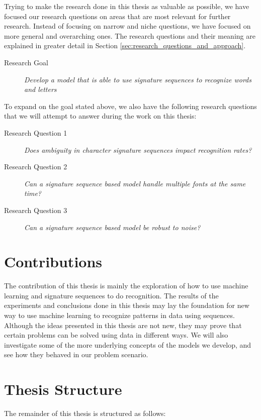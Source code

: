 Trying to make the research done in this thesis as valuable as possible, we have focused our research questions on areas that are most relevant for further research. Instead of focusing on narrow and niche questions, we have focused on more general and overarching ones. The research questions and their meaning are explained in greater detail in Section \ref{sec:research_questions_and_approach}.

\begin{description}
    \item[Research Goal]{\textit{Develop a model that is able to use signature sequences to recognize words and letters}}
\end{description}

To expand on the goal stated above, we also have the following research questions that we will attempt to answer during the work on this thesis:

\begin{description}
    \item[Research Question 1]{\textit{Does ambiguity in character signature sequences impact recognition rates?}}
    \item[Research Question 2]{\textit{Can a signature sequence based model handle multiple fonts at the same time?}}
    \item[Research Question 3]{\textit{Can a signature sequence based model be robust to noise?}}
\end{description}


\section{Contributions}
\label{sec:contributions}
The contribution of this thesis is mainly the exploration of how to use machine learning and signature sequences to do recognition. The results of the experiments and conclusions done in this thesis may lay the foundation for new way to use machine learning to recognize patterns in data using sequences. Although the ideas presented in this thesis are not new, they may prove that certain problems can be solved using data in different ways. We will also investigate some of the more underlying concepts of the models we develop, and see how they behaved in our problem scenario.


\section{Thesis Structure}
The remainder of this thesis is structured as follows:

